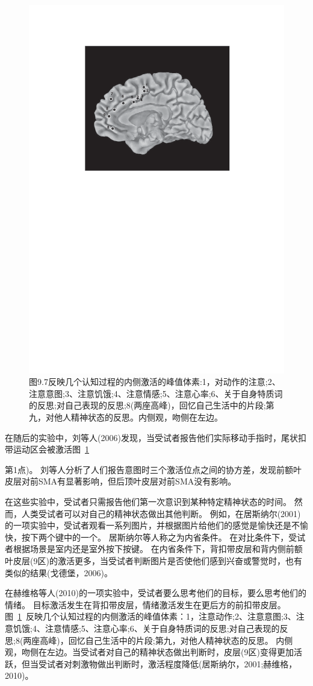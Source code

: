 \begin{figure}[!htb]
	\centering
	\includegraphics[width=0.5\linewidth]{chap9/9_7}
	\caption{图9.7反映几个认知过程的内侧激活的峰值体素:1，对动作的注意;2、注意意图;3、注意饥饿;4、注意情感;5、注意心率;6、关于自身特质词的反思;对自己表现的反思;8(两座高峰)，回忆自己生活中的片段;第九，对他人精神状态的反思。内侧观，吻侧在左边。\label{fig:fig_9_7}}
\end{figure}

\par


在随后的实验中，刘等人(2006)发现，当受试者报告他们实际移动手指时，尾状扣带运动区会被激活图~\ref{fig:fig_9_7}

第1点)。
刘等人分析了人们报告意图时三个激活位点之间的协方差，发现前额叶皮层对前SMA有显著影响，但后顶叶皮层对前SMA没有影响。
\par


在这些实验中，受试者只需报告他们第一次意识到某种特定精神状态的时间。
然而，人类受试者可以对自己的精神状态做出其他判断。
例如，在居斯纳尔(2001)的一项实验中，受试者观看一系列图片，并根据图片给他们的感觉是愉快还是不愉快，按下两个键中的一个。
居斯纳尔等人称之为内省条件。
在对比条件下，受试者根据场景是室内还是室外按下按键。
在内省条件下，背扣带皮层和背内侧前额叶皮层(9区)的激活更多，当受试者判断图片是否使他们感到兴奋或警觉时，也有类似的结果(戈德堡，2006)。
\par


在赫维格等人(2010)的一项实验中，受试者要么思考他们的目标，要么思考他们的情绪。
目标激活发生在背扣带皮层，情绪激活发生在更后方的前扣带皮层。
图~\ref{fig:fig_9_7}~反映几个认知过程的内侧激活的峰值体素：1，注意动作;2、注意意图;3、注意饥饿;4、注意情感;5、注意心率;6、关于自身特质词的反思;对自己表现的反思;8(两座高峰)，回忆自己生活中的片段;第九，对他人精神状态的反思。
内侧观，吻侧在左边。当受试者对自己的精神状态做出判断时，皮层(9区)变得更加活跃，但当受试者对刺激物做出判断时，激活程度降低(居斯纳尔，2001;赫维格，2010)。



